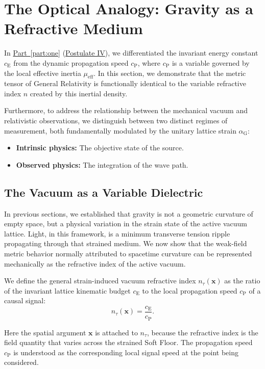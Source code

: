 \section{The Optical Analogy: Gravity as a Refractive Medium}
In \hyperref[part:one]{Part~\ref{part:one}} (\hyperref[postulate:four]{Postulate IV}), we differentiated the invariant energy constant $c_{\mathrm{E}}$ from the dynamic propagation speed $c_{\mathrm{P}}$, where $c_{\mathrm{P}}$ is a variable governed by the local effective inertia $\mu_{\mathrm{eff}}$. In this section, we demonstrate that the metric tensor of General Relativity is functionally identical to the variable refractive index $n$ created by this inertial density.

Furthermore, to address the relationship between the mechanical vacuum and relativistic observations, we distinguish between two distinct regimes of measurement, both fundamentally modulated by the unitary lattice strain $\alpha_{\mathrm{G}}$:
\begin{itemize}
    \item \textbf{Intrinsic physics:} The objective state of the source.
    \item \textbf{Observed physics:} The integration of the wave path.
\end{itemize}

\subsection{The Vacuum as a Variable Dielectric}
\label{sec:refractive_index}

In previous sections, we established that gravity is not a geometric curvature of empty space, but a physical variation in the strain state of the active vacuum lattice. Light, in this framework, is a minimum transverse tension ripple propagating through that strained medium. We now show that the weak-field metric behavior normally attributed to spacetime curvature can be represented mechanically as the refractive index of the active vacuum.

We define the general strain-induced vacuum refractive index $n_\tau(\mathbf{x})$ as the ratio of the invariant lattice kinematic budget $c_{\mathrm{E}}$ to the local propagation speed $c_{\mathrm{P}}$ of a causal signal:
\begin{equation}
    n_\tau(\mathbf{x}) = \frac{c_{\mathrm{E}}}{c_{\mathrm{P}}}.
\end{equation}

Here the spatial argument $\mathbf{x}$ is attached to $n_\tau$, because the refractive index is the field quantity that varies across the strained Soft Floor. The propagation speed $c_{\mathrm{P}}$ is understood as the corresponding local signal speed at the point being considered.

